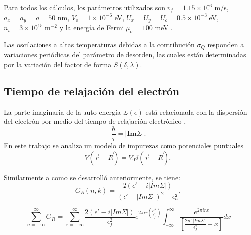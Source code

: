 \begin{frame}
  Para todos los cálculos, los parámetros utilizados son $v_{f}=1.15\times 10^{6}$ m/s, $a_{x}=a_{y}=a=50$ nm,
  $V_{o}=1\times10^{-6}$ eV, $U_{x}=U_{y}=U_{o}=0.5\times10^{-3}$ eV, $n_{i}=3\times10^{15}$ m$^{-2}$
  y la energía de Fermi $\mu_{o}=100$ meV \cite{Kumar2017}.\\

  \vspace{0.5cm}

  Las oscilaciones a altas temperaturas debidas a la contribución $\sigma_{Q} $ responden a variaciones periódicas
  del parámetro de desorden, las cuales están determinadas por la variación del factor de forma $ S(\delta,\lambda)$.
\end{frame}

\subsection{Tiempo de relajación del electrón}

\begin{frame}
  La parte imaginaria de la auto energía $\Sigma(\epsilon)$ está relacionada con la dispersión del electrón
  por medio del tiempo de relajación electrónico \cite{Ando1974},
  \begin{equation}
    \frac{\hbar}{\tau} = |\textbf{Im}\Sigma|.
  \end{equation}
  En este trabajo se analiza un modelo de impurezas como potenciales puntuales
  \begin{equation}
    V(\Vec{r}-\Vec{R}) = V_0 \delta(\Vec{r}-\Vec{R}),
  \end{equation}
\end{frame}

\begin{frame}
  Similarmente a como se desarrolló anteriormente, se tiene:
  \begin{equation}
    G_{R}(n,k) = \frac{2(\epsilon' - i|Im\Sigma|)}{(\epsilon' - |Im\Sigma|)^{2} - \epsilon_{n}^{2}},
    \label{GRnk2}
  \end{equation}

  \begin{equation}
    \sum_{n=-\infty}^{\infty}G_{R}=\sum_{r=-\infty}^{\infty}\frac{2(\epsilon' - i|Im\Sigma|)}{\epsilon_{f}^{2}}e^{2\pi ir\left(\frac{\epsilon'^{2}}{\epsilon_{f}^{2}}\right)}\int_{-\infty}^{\infty}\frac{e^{2\pi irx}}{\left[\frac{2i\epsilon'|Im\Sigma|}{\epsilon_{f}^{2}}-x\right]}dx
    \label{GRPoisson}
  \end{equation}
\end{frame}

